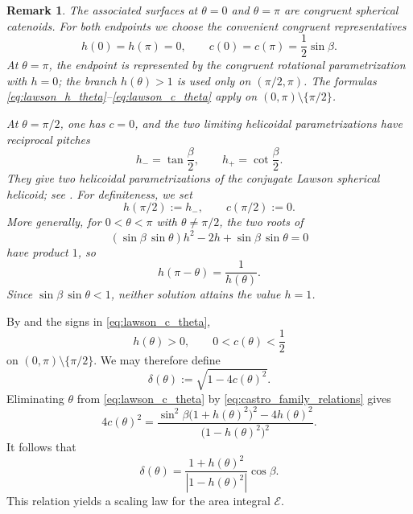\documentclass[a4paper,11pt]{amsart}
\numberwithin{equation}{section}
\theoremstyle{plain}
\newtheorem{rem}[thm]{Remark}
\begin{document}
\begin{rem}
The associated surfaces at $\theta=0$ and $\theta=\pi$ are congruent
spherical catenoids. For both endpoints we choose the convenient congruent
representatives
\begin{equation}\label{eq:associated_endpoint_convention}
h(0)=h(\pi)=0,
\qquad
c(0)=c(\pi)=\frac12\sin\beta.
\end{equation}
At $\theta=\pi$, the endpoint is represented by the congruent rotational
parametrization with $h=0$; the branch $h(\theta)>1$ is used only on
$(\pi/2,\pi)$. The formulas
\eqref{eq:lawson_h_theta}--\eqref{eq:lawson_c_theta} apply on
$(0,\pi)\setminus\{\pi/2\}$.

At $\theta=\pi/2$, one has $c=0$, and the two limiting helicoidal
parametrizations have reciprocal pitches
\begin{equation}\label{eq:lawson_conjugate_pitch}
    h_-=\tan\frac{\beta}{2},\qquad
    h_+=\cot\frac{\beta}{2}.
\end{equation}
They give two helicoidal parametrizations of the conjugate Lawson spherical
helicoid; see
\cite[Theorem~5.4, Theorem~5.6, and Remark~5.7]{Castro2024}. For
definiteness, we set
\begin{equation}\label{eq:associated_midpoint_convention}
    h(\pi/2):=h_-,
    \qquad
    c(\pi/2):=0.
\end{equation}
More generally, for $0<\theta<\pi$ with $\theta\neq\pi/2$, the two
roots of
\[
    (\sin\beta\,\sin\theta)h^2-2h+\sin\beta\,\sin\theta=0
\]
have product $1$, so
\begin{equation}\label{eq:h_theta_reciprocal}
    h(\pi-\theta)=\frac{1}{h(\theta)}.
\end{equation}
Since $\sin\beta\,\sin\theta<1$, neither solution attains the value $h=1$.
\end{rem}

By \cite[Theorem~5.6]{Castro2024} and the signs in
\eqref{eq:lawson_c_theta},
\[
h(\theta)>0,
\qquad
0<c(\theta)<\frac12
\]
on $(0,\pi)\setminus\{\pi/2\}$. We may therefore define
\[
\delta(\theta):=\sqrt{1-4c(\theta)^2}.
\]
Eliminating $\theta$ from \eqref{eq:lawson_c_theta} by \eqref{eq:castro_family_relations} gives
\[
4c(\theta)^2
=
\frac{
\sin^2\beta\bigl(1+h(\theta)^2\bigr)^2-4h(\theta)^2
}{
\bigl(1-h(\theta)^2\bigr)^2
}.
\]
It follows that
\begin{equation}\label{eq:delta_theta}
\delta(\theta)
=
\frac{1+h(\theta)^2}{|1-h(\theta)^2|}\cos\beta.
\end{equation}
This relation yields a scaling law for the area integral $\mathcal E$.
\end{document}
